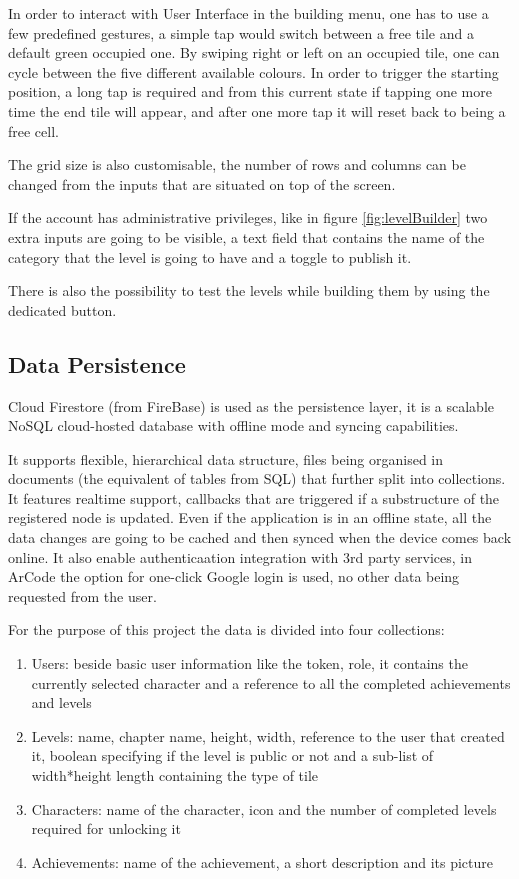 \documentclass[12 pct]{report}
\begin{document}
In order to interact with User Interface in the building menu, one has to use a few predefined gestures, a simple tap would switch between a free tile and a default green occupied one. By swiping right or left on an occupied tile, one can cycle between the five different available colours. In order to trigger the starting position, a long tap is required and from this current state if tapping one more time the end tile will appear, and after one more tap it will reset back to being a free cell.

The grid size is also customisable, the number of rows and columns can be changed from the inputs that are situated on top of the screen. 

If the account has administrative privileges, like in figure \ref{fig:levelBuilder} two extra inputs are going to be visible, a text field that contains the name of the category that the level is going to have and a toggle to publish it. 

There is also the possibility to test the levels while building them by using the dedicated button.
\subsection*{Data Persistence}
Cloud Firestore (from FireBase) is used as the persistence layer, it is a scalable NoSQL cloud-hosted database with offline mode and syncing capabilities.

It supports flexible, hierarchical data structure, files being organised in documents (the equivalent of tables from SQL) that further split into collections. It features realtime support, callbacks that are triggered if a substructure of the registered node is updated. Even if the application is in an offline state, all the data changes are going to be cached and then synced when the device comes back online. It also enable authenticaation integration with 3rd party services, in ArCode the option for one-click Google login is used, no other data being requested from the user.

For the purpose of this project the data is divided into four collections:
\begin{enumerate}
\item Users: beside basic user information like the token, role, it contains the currently selected character and a reference to all the completed achievements and levels
\item Levels: name, chapter name, height, width, reference to the user that created it, boolean specifying if the level is public or not and a sub-list of width*height length containing the type of tile
\item Characters: name of the character, icon and the number of completed levels required for unlocking it
\item Achievements: name of the achievement, a short description and its picture
\end{enumerate}
\end{document}
